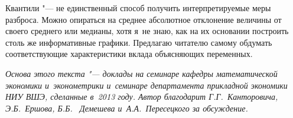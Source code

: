 \documentclass[11pt]{article}
\begin{document}
Квантили "--- не единственный способ получить интерпретируемые меры разброса. Можно опираться на среднее абсолютное отклонение величины от своего среднего или медианы, хотя я~не знаю, как на их основании построить столь же информативные графики. Предлагаю читателю самому обдумать соответствующие характеристики вклада объясняющих переменных.

\medskip
\textit{Основа этого текста "--- доклады на семинаре кафедры математической экономики и~эконометрики и~семинаре департамента прикладной экономики НИУ ВШЭ, сделанные в~2013 году. Автор благодарит Г.Г.~Канторовича, Э.Б.~Ершова, Б.Б.~ Демешева и~А.А.~Пересецкого за обсуждение.}


\printbibliography	
	
\end{document}

